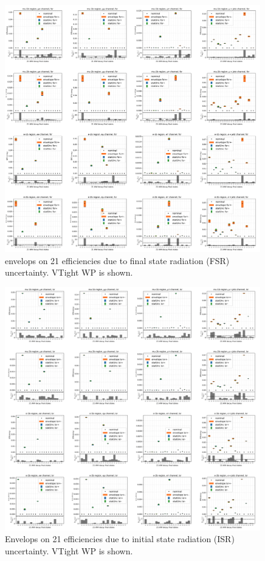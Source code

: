 \begin{figure}
    \centering
    \includegraphics[width=0.99\textwidth]{chapters/Analysis/sectionSystematics/figures/ttTheoretical/fsr.png}    
    \caption{envelops on 21 efficiencies due to final state radiation (FSR) uncertainty. VTight WP is shown.}
    \label{fig:analysis:systematics:effAfterCorrFSR}
\end{figure}



\begin{figure}
    \centering
    \includegraphics[width=0.99\textwidth]{chapters/Analysis/sectionSystematics/figures/ttTheoretical/isr.png}
    \caption{Envelops on 21 efficiencies due to initial state radiation (ISR) uncertainty. VTight WP is shown.}
    \label{fig:analysis:systematics:effAfterCorrISR}
\end{figure}


